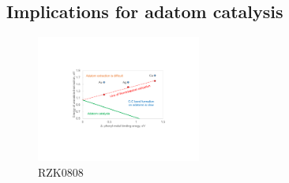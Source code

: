 \documentclass[journal=jacsat,manuscript=article]{achemso}
\begin{document}

\ifdefined\INTERNAL
\subsection{Implications for adatom catalysis}
\fi

\begin{figure}[bt]
\centering
\includegraphics[width=0.48\textwidth]{Fig/conclusion.pdf}
\caption{RZK0808} 
\label{fig:conclusion}
\end{figure}
\end{document}
